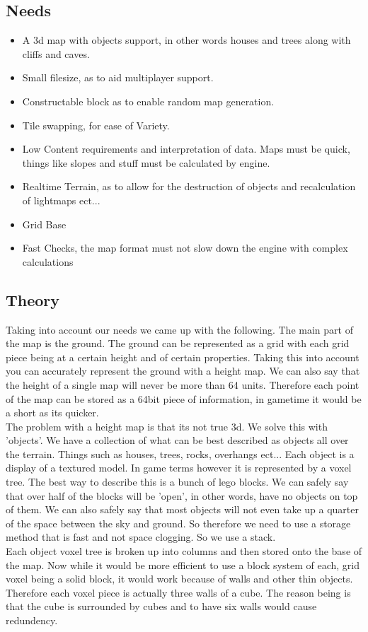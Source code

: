 \documentclass[a4paper]{article}
\begin{document}
\subsection{Needs}
\begin{itemize}
\item A 3d map with objects support, in other words houses and trees along with cliffs and caves.
\item Small filesize, as to aid multiplayer support.
\item Constructable block as to enable random map generation.
\item Tile swapping, for ease of Variety.
\item Low Content requirements and interpretation of data. Maps must be quick, things like slopes and stuff must be calculated by engine.
\item Realtime Terrain, as to allow for the destruction of objects and recalculation of lightmaps ect...
\item Grid Base
\item Fast Checks, the map format must not slow down the engine with complex calculations
\end{itemize}

\subsection{Theory}

Taking into account our needs we came up with the following. The main part of the map is the ground. The ground can be represented as a grid with each grid piece being at a certain height and of certain properties. Taking this into account you can accurately represent the ground with a height map. We can also say that the height of a single map will never be more than 64 units. Therefore each point of the map can be stored as a 64bit piece of information, in gametime it would be a short as its quicker.\\
The problem with a height map is that its not true 3d. We solve this with 'objects'. We have a collection of what can be best described as objects all over the terrain. Things such as houses, trees, rocks, overhangs ect... Each object is a display of a textured model. In game terms however it is represented by a voxel tree. The best way to describe this is a bunch of lego blocks. We can safely say that over half of the blocks will be 'open', in other words, have no objects on top of them. We can also safely say that most objects will not even take up a quarter of the space between the sky and ground. So therefore we need to use a storage method that is fast and not space clogging. So we use a stack.\\
Each object voxel tree is broken up into columns and then stored onto the base of the map. Now while it would be more efficient to use a block system of each, grid voxel being a solid block, it would work because of walls and other thin objects. Therefore each voxel piece is actually three walls of a cube. The reason being is that the cube is surrounded by cubes and to have six walls would cause redundency.
\end{document}

